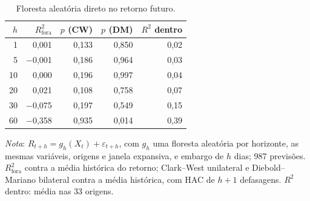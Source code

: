 \begin{table}[H]
\centering
\small
\caption{Floresta aleatória direto no retorno futuro.}
\label{tab:retnl-arvore-retorno}
\begin{tabular}{rrrrr}
\toprule
$h$ & $R^2_{\text{fora}}$ & $p$ (CW) & $p$ (DM) & $R^2$ dentro \\
\midrule
1 & 0{,}001 & 0{,}133 & 0{,}850 & 0{,}02 \\
5 & $-$0{,}001 & 0{,}186 & 0{,}964 & 0{,}03 \\
10 & 0{,}000 & 0{,}196 & 0{,}997 & 0{,}04 \\
20 & 0{,}021 & 0{,}108 & 0{,}758 & 0{,}07 \\
30 & $-$0{,}075 & 0{,}197 & 0{,}549 & 0{,}15 \\
60 & $-$0{,}358 & 0{,}935 & 0{,}014 & 0{,}39 \\
\bottomrule
\end{tabular}
\par\smallskip
\parbox{0.95\linewidth}{\footnotesize\textit{Nota}: $R_{t+h} = g_h(X_t) + \varepsilon_{t+h}$, com $g_h$ uma floresta aleatória por horizonte, as mesmas variáveis, origens e janela expansiva, e embargo de $h$ dias; 987 previsões. $R^2_{\text{fora}}$ contra a média histórica do retorno; Clark--West unilateral e Diebold--Mariano bilateral contra a média histórica, com HAC de $h+1$ defasagens. $R^2$ dentro: média nas 33 origens.}
\end{table}
